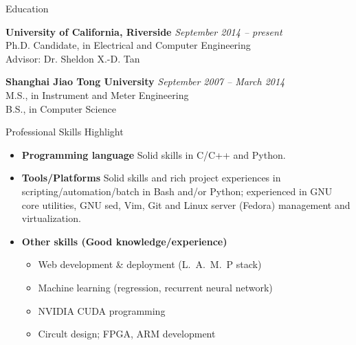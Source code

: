 \documentclass{resume} %
\begin{document}

\begin{rSection}{Education}

{\bf University of California, Riverside} \hfill {\em September 2014 -- present} \\
Ph.D. Candidate, in Electrical and Computer Engineering \\
Advisor: Dr. Sheldon X.-D. Tan

{\bf Shanghai Jiao Tong University} \hfill {\em September 2007 -- March 2014} \\
M.S., in Instrument and Meter Engineering\\
B.S., in Computer Science

\end{rSection}

\begin{rSection}{Professional Skills Highlight}

    \begin{itemize}

        \item \textbf{Programming language} Solid skills in C/C++ and Python.

        \item \textbf{Tools/Platforms} Solid skills and rich project experiences in
            scripting/automation/batch in Bash and/or Python; experienced in
            GNU core utilities, GNU sed, Vim, Git and Linux server (Fedora)
            management and virtualization.

        \item \textbf{Other skills (Good knowledge/experience)}

            \begin{itemize}
                \item Web development \& deployment (L.~A.~M.~P stack)
                \item Machine learning (regression, recurrent neural network)
                \item NVIDIA CUDA programming
                \item Circult design; FPGA, ARM development
            \end{itemize}

    \end{itemize}

\end{rSection}
\end{document}
